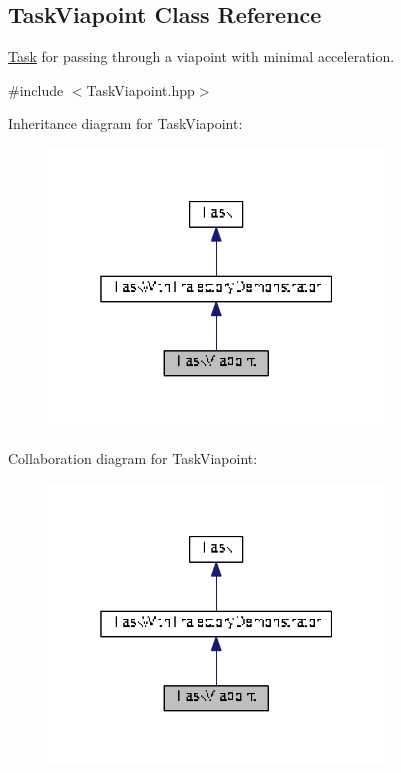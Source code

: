 \hypertarget{classDmpBbo_1_1TaskViapoint}{\subsection{Task\+Viapoint Class Reference}
\label{classDmpBbo_1_1TaskViapoint}
}


\hyperlink{classDmpBbo_1_1Task}{Task} for passing through a viapoint with minimal acceleration.  




{\ttfamily \#include $<$Task\+Viapoint.\+hpp$>$}



Inheritance diagram for Task\+Viapoint\+:
\nopagebreak
\begin{figure}[H]
\begin{center}
\leavevmode
\includegraphics[width=253pt]{classDmpBbo_1_1TaskViapoint__inherit__graph}
\end{center}
\end{figure}


Collaboration diagram for Task\+Viapoint\+:
\nopagebreak
\begin{figure}[H]
\begin{center}
\leavevmode
\includegraphics[width=253pt]{classDmpBbo_1_1TaskViapoint__coll__graph}
\end{center}
\end{figure}
